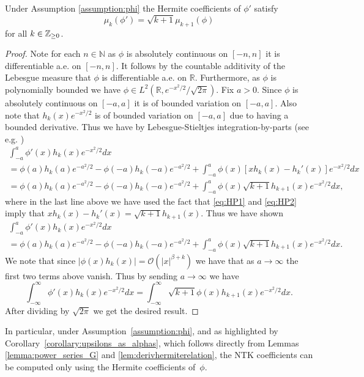 \begin{lemma}\label{lem:derivhermiterelation}
Under Assumption \ref{assumption:phi} the Hermite coefficients of $\phi'$ satisfy
\[ \mu_k(\phi') = \sqrt{k + 1} \mu_{k + 1}(\phi) \]
for all $k \in \mathbb{Z}_{\geq 0}$.
\end{lemma}
\begin{proof}
Note for each $n \in \mathbb{N}$ as $\phi$ is absolutely continuous on $[-n, n]$ it is differentiable a.e. on $[-n, n]$.  It follows by the countable additivity of the Lebesgue measure that $\phi$ is differentiable a.e. on $\mathbb{R}$.  Furthermore, as $\phi$ is polynomially bounded we have $\phi \in L^2(\mathbb{R}, e^{-x^2 / 2} / \sqrt{2 \pi})$.  Fix $a > 0$. Since $\phi$ is absolutely continuous on $[-a, a]$ it is of bounded variation on $[-a, a]$.  Also note that $h_k(x) e^{-x^2 / 2}$ is of bounded variation on $[-a, a]$ due to having a bounded derivative.  Thus we have by Lebesgue-Stieltjes integration-by-parts (see e.g. \citealt[Chapter 3]{folland1999}) 
\begin{gather*}
\int_{-a}^a \phi'(x) h_k(x) e^{-x^2 / 2} dx \\
= \phi(a) h_k(a) e^{-a^2 / 2} - \phi(-a) h_k(-a) e^{-a^2 / 2} + \int_{-a}^a \phi(x) [x h_k(x) - h_k'(x)]e^{-x^2/2} dx \\
= \phi(a) h_k(a) e^{-a^2 / 2} - \phi(-a) h_k(-a) e^{-a^2 / 2} + \int_{-a}^a \phi(x) \sqrt{k + 1} h_{k + 1}(x) e^{-x^2 / 2} dx , 
\end{gather*}
where in the last line above we have used the fact that \eqref{eq:HP1} and \eqref{eq:HP2} imply that $x h_k(x) - h_k'(x) = \sqrt{k + 1} h_{k + 1}(x)$. 
Thus we have shown 
\begin{gather*}
\int_{-a}^a \phi'(x) h_k(x) e^{-x^2 / 2} dx \\
= \phi(a) h_k(a) e^{-a^2 / 2} - \phi(-a) h_k(-a) e^{-a^2 / 2} + \int_{-a}^a \phi(x) \sqrt{k + 1} h_{k + 1}(x) e^{-x^2 / 2} dx.   
\end{gather*}
We note that since $|\phi(x) h_k(x)| = \mathcal{O}(|x|^{\beta + k})$ we have that as $a \rightarrow \infty$ the first two terms above vanish.  Thus by sending $a \rightarrow \infty$ we have
\[ 
\int_{-\infty}^\infty \phi'(x) h_k(x) e^{-x^2 / 2} dx = \int_{-\infty}^\infty \sqrt{k + 1} \phi(x) h_{k + 1}(x) e^{-x^2 / 2} dx.
\]
After dividing by $\sqrt{2 \pi}$ we get the desired result. 
\end{proof}

In particular, under Assumption~\ref{assumption:phi}, and as highlighted by Corollary~\ref{corollary:upsilons_as_alphas}, which follows directly from Lemmas \ref{lemma:power_series_G} and \ref{lem:derivhermiterelation}, the NTK coefficients can be computed only using the Hermite coefficients of~$\phi$. 

